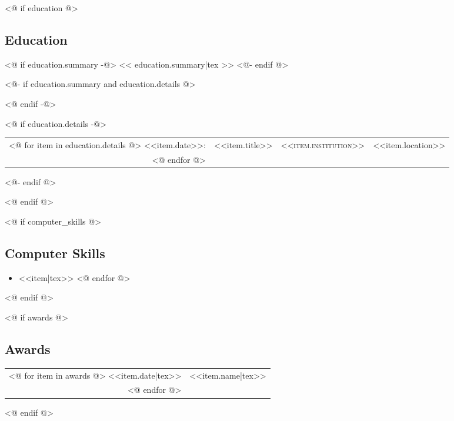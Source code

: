 \documentclass[letter,11pt]{article}
\begin{document}

<@ if education @>

\begin{samepage}
\section*{Education}
<@ if education.summary -@>
<< education.summary|tex >>
<@- endif @>

<@- if education.summary and education.details @>

    \nopagebreak

<@ endif -@>

<@ if education.details -@>
    \begin{tabularx}{\textwidth}{rllL}
    <@ for item in  education.details @>
        <<item.date>>: & <<item.title>> & \textsc{<<item.institution>>} & <<item.location>> \\
    <@ endfor @>
    \end{tabularx}
<@- endif @>

\end{samepage}
<@ endif @>

<@ if computer_skills @>
\begin{samepage}
\section*{Computer Skills}

\begin{itemize}[leftmargin=1.5em]
    \setlength{\itemsep}{0pt}
    \setlength{\parskip}{0pt}
    \setlength{\parsep}{0pt}
<@ for item in computer_skills @>
    \item <<item|tex>>
<@ endfor @>
\end{itemize}
\end{samepage}
<@ endif @>


<@ if awards @>
\begin{samepage}
\section*{Awards}

\begin{tabular}{rl}
<@ for item in awards @>
    <<item.date|tex>> & <<item.name|tex>>\\
<@ endfor @>
\end{tabular}
\end{samepage}
<@ endif @>
\end{document}
